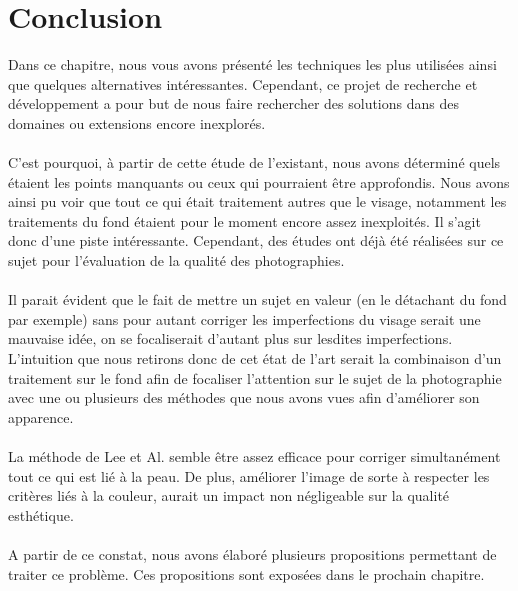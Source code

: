 \documentclass[11pt, french]{report-rd-info}
\begin{document}
\section{Conclusion}
Dans ce chapitre, nous vous avons présenté les techniques les plus utilisées ainsi que quelques alternatives intéressantes. Cependant, ce projet de recherche et développement a pour but de nous faire rechercher des solutions dans des domaines ou extensions encore inexplorés.
\paragraph*{}
C’est pourquoi, à partir de cette étude de l’existant, nous avons déterminé quels étaient les points manquants ou ceux qui pourraient être approfondis. Nous avons ainsi pu voir que tout ce qui était traitement autres que le visage, notamment les traitements du fond étaient pour le moment encore assez inexploités. Il s’agit donc d’une piste intéressante. Cependant, des études ont déjà été réalisées sur ce sujet pour l’évaluation de la qualité des photographies.
\paragraph*{}
Il parait évident que le fait de mettre un sujet en valeur (en le détachant du fond par exemple) sans pour autant corriger les imperfections du visage serait une mauvaise idée, on se focaliserait d’autant plus sur lesdites imperfections. L’intuition que nous retirons donc de cet état de l’art serait la combinaison d’un traitement sur le fond afin de focaliser l’attention sur le sujet de la photographie avec une ou plusieurs des méthodes que nous avons vues afin d’améliorer son apparence. 
\paragraph*{}
La méthode de Lee et Al.\cite{Lee} semble être assez efficace pour corriger simultanément tout ce qui est lié à la peau. De plus, améliorer l'image de sorte à respecter les critères liés à la couleur, aurait un impact non négligeable sur la qualité esthétique. 
\paragraph*{}
A partir de ce constat, nous avons élaboré plusieurs propositions permettant de traiter ce problème. Ces propositions sont exposées dans le prochain chapitre.
\end{document}

